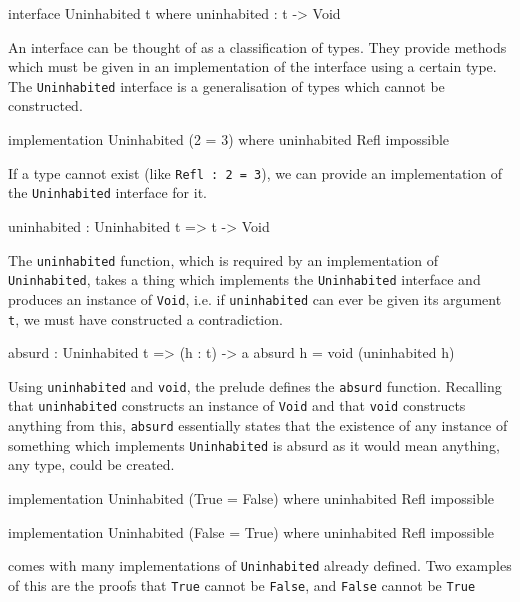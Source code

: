     \begin{code}[caption={The \texttt{Uninhabited} interface}]
        interface Uninhabited t where
            uninhabited : t -> Void
    \end{code}
    
    An interface can be thought of as a classification of types. They provide methods which must be given in an implementation of the interface using a certain type. The \texttt{Uninhabited} interface is a generalisation of types which cannot be constructed.
    
    \begin{code}[caption={2 cannot equal 3}]
            implementation Uninhabited (2 = 3) where
                uninhabited Refl impossible
    \end{code}
    If a type cannot exist (like \texttt{Refl : 2 = 3}), we can provide an implementation of the \texttt{Uninhabited} interface for it.
    
    \begin{code}[caption={The \texttt{uninhabited} function}]
            uninhabited : Uninhabited t => t -> Void
    \end{code}
    The \texttt{uninhabited} function, which is required by an implementation of \texttt{Uninhabited}, takes a thing which implements the \texttt{Uninhabited} interface and produces an instance of \texttt{Void}, i.e. if \texttt{uninhabited} can ever be given its argument \texttt{t}, we must have constructed a contradiction.

    \newpage

    \begin{code}[caption={The \texttt{absurd} function}]
            absurd : Uninhabited t => (h : t) -> a
            absurd h = void (uninhabited h)
    \end{code}
    
    Using \texttt{uninhabited} and \texttt{void}, the \Idris prelude defines the \texttt{absurd} function. Recalling that \texttt{uninhabited} constructs an instance of \texttt{Void} and that \texttt{void} constructs anything from this, \texttt{absurd} essentially states that the existence of any instance of something which implements \texttt{Uninhabited} is absurd as it would mean anything, any type, could be created.
    
    \begin{code}[caption={Example pre-defined implementations of \texttt{Uninhabited}}]
        implementation Uninhabited (True = False) where
            uninhabited Refl impossible
            
        implementation Uninhabited (False = True) where
            uninhabited Refl impossible
    \end{code}
    \Idris comes with many implementations of \texttt{Uninhabited} already defined. Two examples of this are the proofs that \texttt{True} cannot be \texttt{False}, and \texttt{False} cannot be \texttt{True}
    
